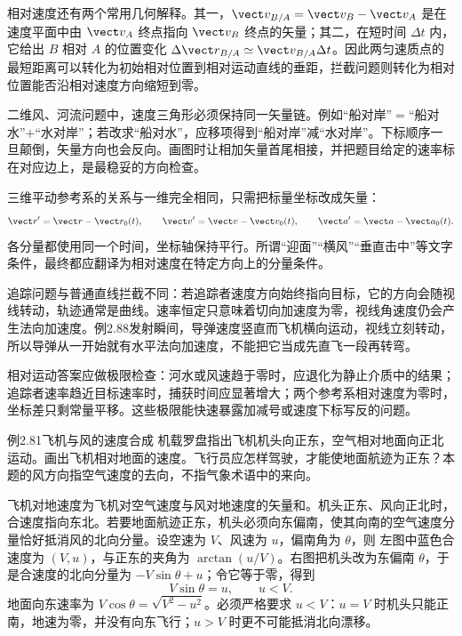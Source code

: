 相对速度还有两个常用几何解释。其一，$\vect v_{B/A}=\vect v_B-\vect v_A$ 是在速度平面中由 $\vect v_A$ 终点指向 $\vect v_B$ 终点的矢量；其二，在短时间 $\Delta t$ 内，它给出 $B$ 相对 $A$ 的位置变化 $\Delta\vect r_{B/A}\simeq\vect v_{B/A}\Delta t$。因此两匀速质点的最短距离可以转化为初始相对位置到相对运动直线的垂距，拦截问题则转化为相对位置能否沿相对速度方向缩短到零。

二维风、河流问题中，速度三角形必须保持同一矢量链。例如“船对岸”$=$“船对水”$+$“水对岸”；若改求“船对水”，应移项得到“船对岸”减“水对岸”。下标顺序一旦颠倒，矢量方向也会反向。画图时让相加矢量首尾相接，并把题目给定的速率标在对应边上，是最稳妥的方向检查。

三维平动参考系的关系与一维完全相同，只需把标量坐标改成矢量：
\begin{equation}
 \vect r'=\vect r-\vect r_0(t),\qquad
 \vect v'=\vect v-\vect v_0(t),\qquad
 \vect a'=\vect a-\vect a_0(t).
\end{equation}
各分量都使用同一个时间，坐标轴保持平行。所谓“迎面”“横风”“垂直击中”等文字条件，最终都应翻译为相对速度在特定方向上的分量条件。

追踪问题与普通直线拦截不同：若追踪者速度方向始终指向目标，它的方向会随视线转动，轨迹通常是曲线。速率恒定只意味着切向加速度为零，视线角速度仍会产生法向加速度。例2.88发射瞬间，导弹速度竖直而飞机横向运动，视线立刻转动，所以导弹从一开始就有水平法向加速度，不能把它当成先直飞一段再转弯。

相对运动答案应做极限检查：河水或风速趋于零时，应退化为静止介质中的结果；追踪者速率趋近目标速率时，捕获时间应显著增大；两个参考系相对速度为零时，坐标差只剩常量平移。这些极限能快速暴露加减号或速度下标写反的问题。

\begin{origexamplebox}{例2.81\quad 飞机与风的速度合成}
机载罗盘指出飞机机头向正东，空气相对地面向正北运动。画出飞机相对地面的速度。飞行员应怎样驾驶，才能使地面航迹为正东？本题的风方向指空气速度的去向，不指气象术语中的来向。
\end{origexamplebox}
\begin{xesolution}
飞机对地速度为飞机对空气速度与风对地速度的矢量和。机头正东、风向正北时，合速度指向东北。若要地面航迹正东，机头必须向东偏南，使其向南的空气速度分量恰好抵消风的北向分量。设空速为 $V$、风速为 $u$，偏南角为 $\theta$，则
\AircraftWindDiagram
左图中蓝色合速度为 $(V,u)$，与正东的夹角为 $\arctan(u/V)$。右图把机头改为东偏南 $\theta$，于是合速度的北向分量为 $-V\sin\theta+u$；令它等于零，得到
\[
\boxed{V\sin\theta=u},\qquad u<V.
\]
地面向东速率为 $V\cos\theta=\sqrt{V^2-u^2}$。必须严格要求 $u<V$：$u=V$ 时机头只能正南，地速为零，并没有向东飞行；$u>V$ 时更不可能抵消北向漂移。
\end{xesolution}

